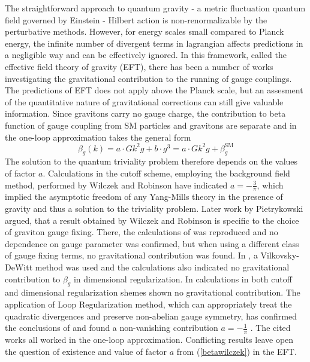 \documentclass[11pt, a4paper]{article}
\begin{document}
\pagebreak
The straightforward approach to quantum gravity - a metric fluctuation quantum field governed by Einstein - Hilbert action
is non-renormalizable by the perturbative methods\cite{book}. However, for energy scales small
compared to Planck energy, the infinite number of divergent terms in lagrangian affects predictions in a negligible way and can be effectively ignored.
In this framework, called the effective field theory of gravity (EFT), there has been a number of works investigating
the gravitational contribution to the running of gauge couplings. The predictions of EFT does not apply above
the Planck scale, but an assesment of the quantitative nature of gravitational corrections can still give valuable information.
Since gravitons carry no gauge charge, the contribution to beta function of gauge coupling from SM particles and gravitons are separate
and in the one-loop approximation takes the general form
\begin{equation}
    \beta_g(k) = a \cdot G k^2 g + b \cdot g^3 = a \cdot G k^2 g + \beta_{g}^{\text{SM}}
    \label{betawilczek}
\end{equation}
The solution to the quantum triviality problem therefore depends on the values of factor $a$.
Calculations in the cutoff scheme, employing the background field method, performed by Wilczek and Robinson \cite{wilczek} have indicated
$a = - \frac{3}{\pi} $, which implied the asymptotic freedom of any Yang-Mills theory in the presence of gravity and thus a solution to the triviality problem.
Later work by Pietrykowski \cite{pietrykowski} argued, that a result obtained by Wilczek and Robinson is specific to the choice of graviton gauge fixing.
There, the calculations of \cite{wilczek} was reproduced and no dependence on gauge parameter was confirmed, but when using a different class of gauge fixing terms, no gravitational contribution was found. 
In \cite{toms}, a Vilkovsky-DeWitt method was used and the calculations also indicated no gravitational contribution to $\beta_g$ in dimensional regularization. 
In \cite{absence} calculations in both cutoff and dimensional regularization shemes shown no gravitational contribution.
The application of Loop Regularization method, which can appropriately treat the quadratic divergences and preserve non-abelian gauge symmetry,
has confirmed the conclusions of \cite{wilczek} and found a non-vanishing contribution $a = -\frac{1}{\pi} $ \cite{tang}.
The cited works all worked in the one-loop approximation.
Conflicting results leave open the question of existence and value of factor $a$ from (\ref{betawilczek}) in the EFT.
\end{document}
